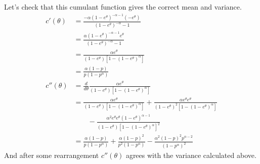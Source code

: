 Let's check that this cumulant function gives the correct mean and variance.
\begin{align*}
   c'(\theta)
   & =
   \frac{- \alpha (1 - e^\theta)^{- \alpha - 1} (- e^\theta)}
   {(1 - e^\theta)^{- \alpha} - 1}
   \\
   & =
   \frac{\alpha (1 - e^\theta)^{- \alpha - 1} e^\theta}
   {(1 - e^\theta)^{- \alpha} - 1}
   \\
   & =
   \frac{\alpha e^\theta}{(1 - e^\theta) [1 - (1 - e^\theta)^\alpha]}
   \\
   & =
   \frac{\alpha (1 - p)}{p (1 - p^\alpha)}
   \\
   c''(\theta)
   & =
   \frac{d}{d \theta}
   \frac{\alpha e^\theta}{(1 - e^\theta) [1 - (1 - e^\theta)^\alpha]}
   \\
   & =
   \frac{\alpha e^\theta}{(1 - e^\theta) [1 - (1 - e^\theta)^\alpha]}
   +
   \frac{\alpha e^\theta e^\theta}{(1 - e^\theta)^2 [1 - (1 - e^\theta)^\alpha]}
   \\
   & \qquad
   - \frac{\alpha^2 e^\theta e^\theta (1 - e^\theta)^{\alpha - 1}
   }{(1 - e^\theta) [1 - (1 - e^\theta)^\alpha]^2}
   \\
   & =
   \frac{\alpha (1 - p)}{p (1 - p^\alpha)}
   +
   \frac{\alpha (1 - p)^2}{p^2 (1 - p^\alpha)}
   -
   \frac{\alpha^2 (1 - p)^2 p^{\alpha - 2}}{(1 - p^\alpha)^2}
\end{align*}
%
%
%
And after some rearrangement $c''(\theta)$ agrees with the variance
calculated above.

